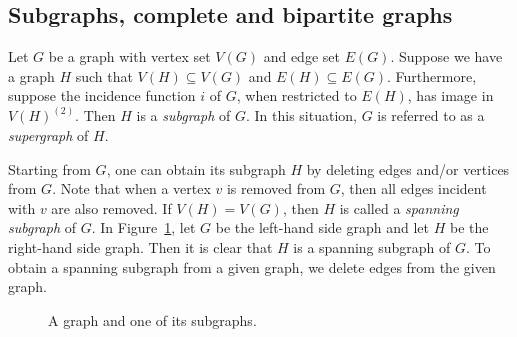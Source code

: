 
\subsection{Subgraphs, complete and bipartite graphs}

Let $G$ be a graph with vertex set $V(G)$ and edge set $E(G)$. Suppose
we have a graph $H$ such that $V(H) \subseteq V(G)$ and
$E(H) \subseteq E(G)$. Furthermore, suppose the incidence function $i$
of $G$, when restricted to $E(H)$, has image in $V(H)^{(2)}$. Then $H$
is a \emph{subgraph} of $G$. In this situation, $G$ is
referred to as a \emph{supergraph} of $H$.

Starting from $G$, one can obtain its subgraph $H$ by deleting edges
and/or vertices from $G$. Note that when a vertex $v$ is removed from
$G$, then all edges incident with $v$ are also removed. If
$V(H) = V(G)$, then $H$ is called a
\emph{spanning subgraph} of $G$. In
Figure~\ref{fig:introduction:star_subgraph}, let $G$ be the left-hand
side graph and let $H$ be the right-hand side graph. Then it is clear
that $H$ is a spanning subgraph of $G$. To obtain a spanning subgraph
from a given graph, we delete edges from the given graph.

\begin{figure}[!htbp]
\centering
{}
\qquad
{}
\caption{A graph and one of its subgraphs.}
\label{fig:introduction:star_subgraph}
\end{figure}

